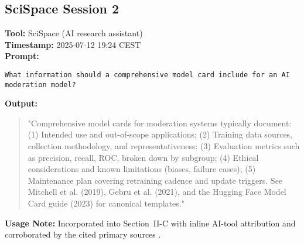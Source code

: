 \documentclass[11pt]{article}
\begin{document}
\subsection*{SciSpace Session 2}
\textbf{Tool:} SciSpace (AI research assistant)\\
\textbf{Timestamp:} 2025-07-12 19:24 CEST\\
\textbf{Prompt:}
\begin{verbatim}
What information should a comprehensive model card include for an AI
moderation model?
\end{verbatim}
\textbf{Output:}
\begin{quote}
"Comprehensive model cards for moderation systems typically document: (1)
Intended use and out-of-scope applications; (2) Training data sources,
collection methodology, and representativeness; (3) Evaluation metrics such as
precision, recall, ROC, broken down by subgroup; (4) Ethical considerations and
known limitations (biases, failure cases); (5) Maintenance plan covering
retraining cadence and update triggers. See Mitchell et al. (2019), Gebru et al.
(2021), and the Hugging Face Model Card guide (2023) for canonical templates."
\end{quote}
\textbf{Usage Note:} Incorporated into Section~II-C with inline AI-tool attribution and corroborated by the cited primary sources \cite{mitchell2019modelcards, gebru2021datasheets, huggingface2023modelcards}.
\end{document}

